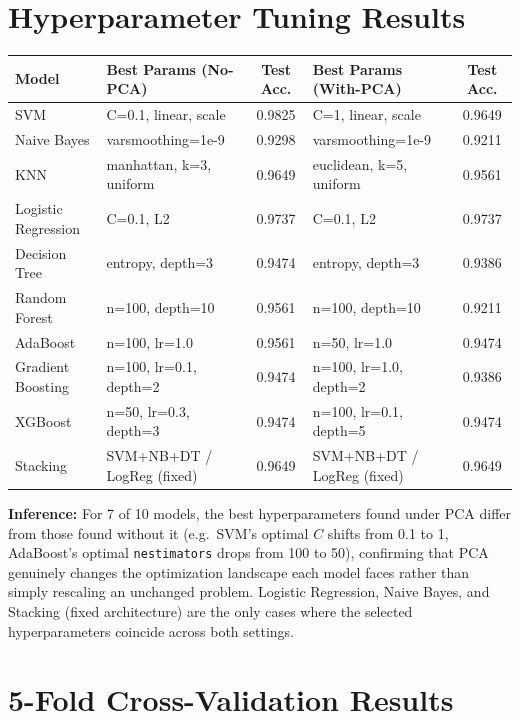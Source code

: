\documentclass[12pt,a4paper]{article}
\DeclareRobustCommand{\_}{\textunderscore\allowbreak}
\begin{document}
\section{Hyperparameter Tuning Results}

\begingroup\small
\begin{longtable}{l>{\raggedright}p{3.6cm}c>{\raggedright}p{3.6cm}c}
\toprule
Model & Best Params (No-PCA) & Test Acc. & Best Params (With-PCA) & Test Acc. \\
\midrule
SVM & C=0.1, linear, scale & 0.9825 & C=1, linear, scale & 0.9649 \\
Naive Bayes & var\_smoothing=1e-9 & 0.9298 & var\_smoothing=1e-9 & 0.9211 \\
KNN & manhattan, k=3, uniform & 0.9649 & euclidean, k=5, uniform & 0.9561 \\
Logistic Regression & C=0.1, L2 & 0.9737 & C=0.1, L2 & 0.9737 \\
Decision Tree & entropy, depth=3 & 0.9474 & entropy, depth=3 & 0.9386 \\
Random Forest & n=100, depth=10 & 0.9561 & n=100, depth=10 & 0.9211 \\
AdaBoost & n=100, lr=1.0 & 0.9561 & n=50, lr=1.0 & 0.9474 \\
Gradient Boosting & n=100, lr=0.1, depth=2 & 0.9474 & n=100, lr=1.0, depth=2 & 0.9386 \\
XGBoost & n=50, lr=0.3, depth=3 & 0.9474 & n=100, lr=0.1, depth=5 & 0.9474 \\
Stacking & SVM+NB+DT / LogReg (fixed) & 0.9649 & SVM+NB+DT / LogReg (fixed) & 0.9649 \\
\bottomrule
\end{longtable}
\endgroup

\textbf{Inference:} For 7 of 10 models, the best hyperparameters found
under PCA differ from those found without it (e.g.\ SVM's optimal $C$
shifts from 0.1 to 1, AdaBoost's optimal \texttt{n\_estimators} drops from
100 to 50), confirming that PCA genuinely changes the optimization
landscape each model faces rather than simply rescaling an unchanged
problem. Logistic Regression, Naive Bayes, and Stacking (fixed
architecture) are the only cases where the selected hyperparameters
coincide across both settings.

\section{5-Fold Cross-Validation Results}
\end{document}
